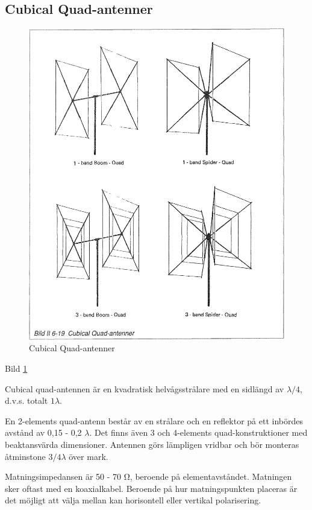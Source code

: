 \subsection{Cubical Quad-antenner}

\begin{figure}
  \includegraphics[width=\textwidth]{images/bild_2_6-19}
  \caption{Cubical Quad-antenner}
  \label{fig:bildII6-19}
\end{figure}

Bild \ref{fig:bildII6-19}

Cubical quad-antennen är en kvadratisk helvågsstrålare med en sidlängd
av \(\lambda/4\), d.v.s. totalt \(1\lambda\).

En 2-elements quad-antenn består av en strålare och en reflektor på
ett inbördes avstånd av 0,15 - 0,2 \(\lambda\). Det finns även 3 och
4-elements quad-konstruktioner med beaktansvärda dimensioner. Antennen
görs lämpligen vridbar och bör monteras åtminstone \(3/4 \lambda\)
över mark.

Matningsimpedansen är 50 - 70 Ω, beroende på elementavståndet.
Matningen sker oftast med en koaxialkabel. Beroende på hur
matningspunkten placeras är det möjligt att välja mellan kan
horisontell eller vertikal polarisering.

